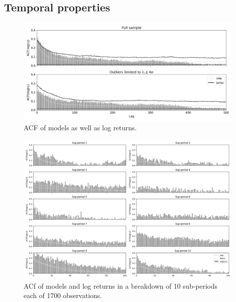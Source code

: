 \subsection{Temporal properties}
\label{Sec: Temporal properties}


\begin{figure}[H] 
    \centering
    \includegraphics[width=1.0\textwidth]{analysis/stylized_facts/images/acf_abs_models.png}
    \caption{ACF of models as well as log returns.}
    \label{fig:stylized_facts_acf_plots} 
\end{figure}

\begin{figure}[H] 
    \centering
    \includegraphics[width=1.0\textwidth]{analysis/stylized_facts/images/acf_abs_subperiods.png}
    \caption{ACf of models and log returns in a breakdown of 10 sub-periods each of 1700 observations.}
    \label{fig:stylized_facts_acf_plots} 
\end{figure}

